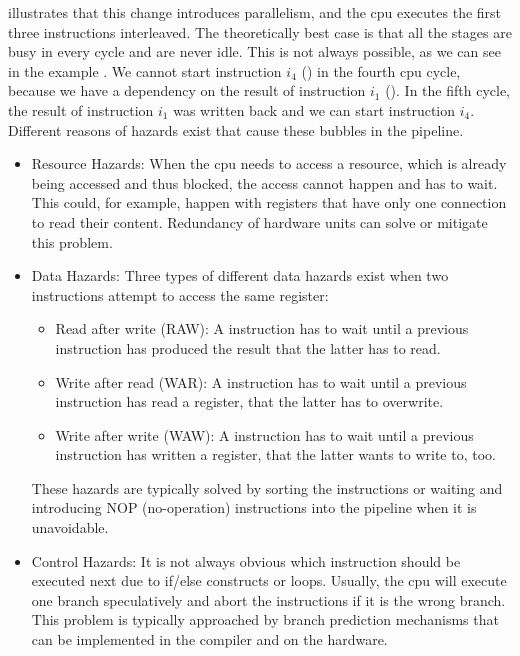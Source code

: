  illustrates that this change introduces parallelism, and the \ac{cpu} executes the first three instructions interleaved.
The theoretically best case is that all the stages are busy in every cycle and are never idle.
This is not always possible, as we can see in the example .
We cannot start instruction $i_4$ () in the fourth \ac{cpu} cycle, because we have a dependency on the result of instruction $i_1$ ().
In the fifth cycle, the result of instruction $i_1$ was written back and we can start instruction $i_4$.
Different reasons of hazards exist that cause these bubbles in the pipeline.
\begin{itemize}
    \item Resource Hazards:
        When the \ac{cpu} needs to access a resource, which is already being accessed and thus blocked, the access cannot happen and has to wait.
        This could, for example, happen with registers that have only one connection to read their content.
        Redundancy of hardware units can solve or mitigate this problem.
    \item Data Hazards:
        Three types of different data hazards exist when two instructions attempt to access the same register:
        \begin{itemize}
            \item Read after write (RAW): A instruction has to wait until a previous instruction has produced the result that the latter has to read.
            \item Write after read (WAR): A instruction has to wait until a previous instruction has read a register, that the latter has to overwrite.
            \item Write after write (WAW): A instruction has to wait until a previous instruction has written a register, that the latter wants to write to, too.
        \end{itemize}
        These hazards are typically solved by sorting the instructions or waiting and introducing NOP (no-operation) instructions into the pipeline when it is unavoidable.
    \item Control Hazards:
        It is not always obvious which instruction should be executed next due to if/else constructs or loops.
        Usually, the \ac{cpu} will execute one branch speculatively and abort the instructions if it is the wrong branch.
        This problem is typically approached by branch prediction mechanisms that can be implemented in the compiler and on the hardware.
\end{itemize}

